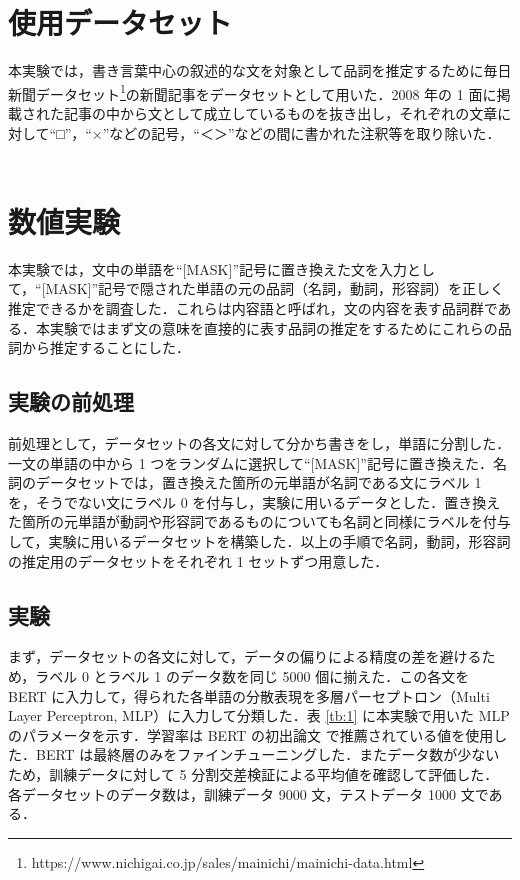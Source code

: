 \documentclass[twocolumn]{jarticle}
\begin{document}



\section{使用データセット}
本実験では，書き言葉中心の叙述的な文を対象として品詞を推定するために毎日新聞データセット\footnote{https://www.nichigai.co.jp/sales/mainichi/mainichi-data.html}の新聞記事をデータセットとして用いた．2008 年の 1 面に掲載された記事の中から文として成立しているものを抜き出し，それぞれの文章に対して“□”，“×”などの記号，“＜＞”などの間に書かれた注釈等を取り除いた．
　




\section{数値実験}
本実験では，文中の単語を“[MASK]”記号に置き換えた文を入力として，“[MASK]”記号で隠された単語の元の品詞（名詞，動詞，形容詞）を正しく推定できるかを調査した．これらは内容語と呼ばれ，文の内容を表す品詞群である．本実験ではまず文の意味を直接的に表す品詞の推定をするためにこれらの品詞から推定することにした．

  \subsection{実験の前処理}
前処理として，データセットの各文に対して分かち書きをし，単語に分割した．一文の単語の中から 1 つをランダムに選択して“[MASK]”記号に置き換えた．名詞のデータセットでは，置き換えた箇所の元単語が名詞である文にラベル 1 を，そうでない文にラベル 0 を付与し，実験に用いるデータとした．置き換えた箇所の元単語が動詞や形容詞であるものについても名詞と同様にラベルを付与して，実験に用いるデータセットを構築した．以上の手順で名詞，動詞，形容詞の推定用のデータセットをそれぞれ 1 セットずつ用意した．\par

  \subsection{実験}
まず，データセットの各文に対して，データの偏りによる精度の差を避けるため，ラベル 0 とラベル 1 のデータ数を同じ 5000 個に揃えた．この各文を BERT に入力して，得られた各単語の分散表現を多層パーセプトロン（Multi Layer Perceptron, MLP）に入力して分類した．表 \ref{tb:1} に本実験で用いた MLP のパラメータを示す．学習率は BERT の初出論文 \cite{DBLP} で推薦されている値を使用した．BERT は最終層のみをファインチューニングした．またデータ数が少ないため，訓練データに対して 5 分割交差検証による平均値を確認して評価した．各データセットのデータ数は，訓練データ 9000 文，テストデータ 1000 文である．
\end{document}
